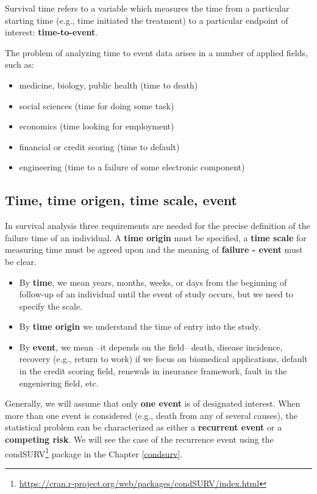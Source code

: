 \documentclass[]{book}
\providecommand{\tightlist}{%
  \setlength{\itemsep}{0pt}\setlength{\parskip}{0pt}}
\let\rmarkdownfootnote\footnote%
\def\footnote{\protect\rmarkdownfootnote}
\renewcommand{\href}[2]{#2\footnote{\url{#1}}}
\theoremstyle{definition}
\theoremstyle{definition}
\theoremstyle{definition}
\theoremstyle{remark}
\begin{document}
Survival time refers to a variable which measures the time from a
particular starting time (e.g., time initiated the treatment) to a
particular endpoint of interest: \textbf{time-to-event}.

The problem of analyzing time to event data arises in a number of
applied fields, such as:

\begin{itemize}
\tightlist
\item
  medicine, biology, public health (time to death)
\item
  social sciences (time for doing some task)
\item
  economics (time looking for employment)
\item
  financial or credit scoring (time to default)
\item
  engineering (time to a failure of some electronic component)
\end{itemize}

\subsection{Time, time origen, time scale,
event}\label{time-time-origen-time-scale-event}

In survival analysis three requirements are needed for the precise
definition of the failure time of an individual. A \textbf{time origin}
must be specified, a \textbf{time scale} for measuring time must be
agreed upon and the meaning of \textbf{failure - event} must be clear.

\begin{itemize}
\item
  By \textbf{time}, we mean years, months, weeks, or days from the
  beginning of follow-up of an individual until the event of study
  occurs, but we need to specify the scale.
\item
  By \textbf{time origin} we understand the time of entry into the
  study.
\item
  By \textbf{event}, we mean --it depends on the field-- death, disease
  incidence, recovery (e.g., return to work) if we focus on biomedical
  applications, default in the credit scoring field, renewals in
  insurance framework, fault in the engeniering field, etc.
\end{itemize}

Generally, we will assume that only \textbf{one event} is of designated
interest. When more than one event is considered (e.g., death from any
of several causes), the statistical problem can be characterized as
either a \textbf{recurrent event} or a \textbf{competing risk}. We will
see the case of the recurrence event using the
\href{https://cran.r-project.org/web/packages/condSURV/index.html}{condSURV}
package in the Chapter \ref{condsurv}.
\end{document}
